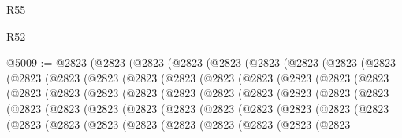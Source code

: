\begin{lexlean}{R55}
\begin{lexlean}{R52}
\begin{coremodule}
{{{{{{{{{{{{{{{{{{{{{{{{{{{{{{{{{{{{{{{{{{{{{{{{{{{{{{{{{{{{{{{{{{{{{{{{{{{{{{{{{{{{{{{{{{{{{{{{{{{{{{{{{{{{{{{{{{{{{{{{{{{{{{{{{{{{{{{{{{{{{{{{{{{{{{{{{{{{{{{{{{{{{{{{{{{{{{{{{{{{{{{{{{{{{{{{{{{{{{@5009 := @2823
    (@2823
      (@2823
        (@2823
          (@2823
            (@2823
              (@2823
                (@2823
                  (@2823
                    (@2823
                      (@2823
                        (@2823
                          (@2823
                            (@2823
                              (@2823
                                (@2823
                                  (@2823
                                    (@2823
                                      (@2823
                                        (@2823
                                          (@2823
                                            (@2823
                                              (@2823
                                                (@2823
                                                  (@2823
                                                    (@2823
                                                      (@2823
                                                        (@2823
                                                          (@2823
                                                            (@2823
                                                              (@2823
                                                                (@2823
                                                                  (@2823
                                                                    (@2823
                                                                      (@2823
                                                                        (@2823
                                                                          (@2823
                                                                            (@2823
                                                                              (@2823
                                                                                (@2823
                                                                                  (@2823
                                                                                    (@2823
                                                                                      (@2823
                                                                                        (@2823
                                                                                          (@2823
                                                                                            (@2823
                                                                                              (@2823
                                                                                                (@2823
}}}}}}}}}}}}}}}}}}}}}}}}}}}}}}}}}}}}}}}}}}}}}}}}}}}}}}}}}}}}}}}}}}}}}}}}}}}}}}}}}}}}}}}}}}}}}}}}}}}}}}}}}}}}}}}}}}}}}}}}}}}}}}}}}}}}}}}}}}}}}}}}}}}}}}}}}}}}}}}}}}}}}}}}}}}}}}}}}}}}}}}}}}}}}}}}}}}}}}
\end{coremodule}
\end{lexlean}
\end{lexlean}
